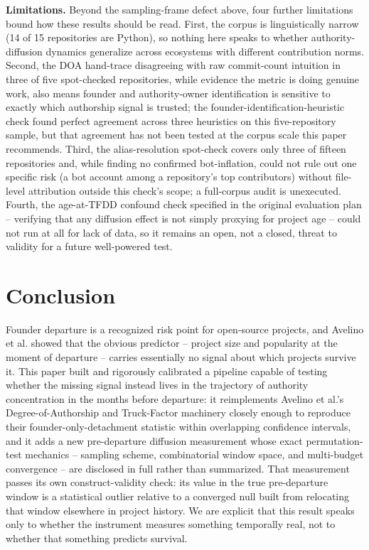 \documentclass[11pt,letterpaper]{article}
\begin{document}
\textbf{Limitations.} Beyond the sampling-frame defect above, four further limitations bound how these results should be read. First, the corpus is linguistically narrow (14 of 15 repositories are Python), so nothing here speaks to whether authority-diffusion dynamics generalize across ecosystems with different contribution norms. Second, the DOA hand-trace disagreeing with raw commit-count intuition in three of five spot-checked repositories, while evidence the metric is doing genuine work, also means founder and authority-owner identification is sensitive to exactly which authorship signal is trusted; the founder-identification-heuristic check found perfect agreement across three heuristics on this five-repository sample, but that agreement has not been tested at the corpus scale this paper recommends. Third, the alias-resolution spot-check covers only three of fifteen repositories and, while finding no confirmed bot-inflation, could not rule out one specific risk (a bot account among a repository's top contributors) without file-level attribution outside this check's scope; a full-corpus audit is unexecuted. Fourth, the age-at-TFDD confound check specified in the original evaluation plan -- verifying that any diffusion effect is not simply proxying for project age -- could not run at all for lack of data, so it remains an open, not a closed, threat to validity for a future well-powered test.

\section{Conclusion}

Founder departure is a recognized risk point for open-source projects, and Avelino et al. showed that the obvious predictor -- project size and popularity at the moment of departure -- carries essentially no signal about which projects survive it. This paper built and rigorously calibrated a pipeline capable of testing whether the missing signal instead lives in the trajectory of authority concentration in the months before departure: it reimplements Avelino et al.'s Degree-of-Authorship and Truck-Factor machinery closely enough to reproduce their founder-only-detachment statistic within overlapping confidence intervals, and it adds a new pre-departure diffusion measurement whose exact permutation-test mechanics -- sampling scheme, combinatorial window space, and multi-budget convergence -- are disclosed in full rather than summarized. That measurement passes its own construct-validity check: its value in the true pre-departure window is a statistical outlier relative to a converged null built from relocating that window elsewhere in project history. We are explicit that this result speaks only to whether the instrument measures something temporally real, not to whether that something predicts survival.
\end{document}
